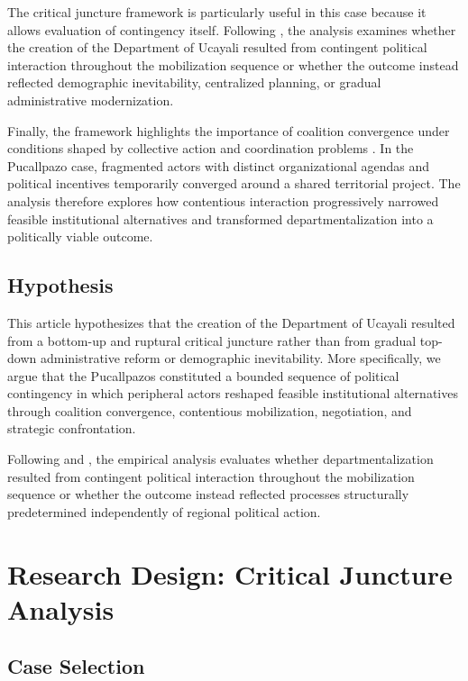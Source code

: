 \documentclass[12pt]{article}
\begin{document}
The critical juncture framework is particularly useful in this case because it allows evaluation of contingency itself. Following \textcite{capoccia_study_2007}, the analysis examines whether the creation of the Department of Ucayali resulted from contingent political interaction throughout the mobilization sequence or whether the outcome instead reflected demographic inevitability, centralized planning, or gradual administrative modernization.

Finally, the framework highlights the importance of coalition convergence under conditions shaped by collective action and coordination problems \parencite{moore_rational_1995}. In the Pucallpazo case, fragmented actors with distinct organizational agendas and political incentives temporarily converged around a shared territorial project. The analysis therefore explores how contentious interaction progressively narrowed feasible institutional alternatives and transformed departmentalization into a politically viable outcome.



\subsection{Hypothesis}

This article hypothesizes that the creation of the Department of Ucayali resulted from a bottom-up and ruptural critical juncture rather than from gradual top-down administrative reform or demographic inevitability. More specifically, we argue that the Pucallpazos constituted a bounded sequence of political contingency in which peripheral actors reshaped feasible institutional alternatives through coalition convergence, contentious mobilization, negotiation, and strategic confrontation.

Following \textcite{collier_critical_2022} and \textcite{capoccia_study_2007}, the empirical analysis evaluates whether departmentalization resulted from contingent political interaction throughout the mobilization sequence or whether the outcome instead reflected processes structurally predetermined independently of regional political action.



\section{Research Design: Critical Juncture Analysis}

\subsection{Case Selection}
\end{document}
